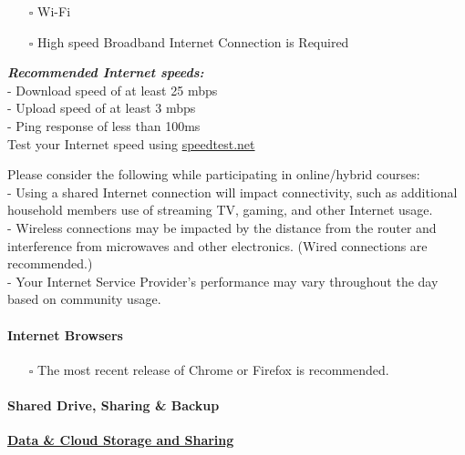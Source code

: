 \documentclass[
]{book}
\providecommand{\tightlist}{%
  \setlength{\itemsep}{0pt}\setlength{\parskip}{0pt}}
\theoremstyle{definition}
\theoremstyle{definition}
\theoremstyle{definition}
\theoremstyle{definition}
\theoremstyle{remark}
\begin{document}
\begin{itemize}
\tightlist
\item[$\square$]
  Wi-Fi\\
\item[$\square$]
  High speed Broadband Internet Connection is Required
\end{itemize}

\textbf{\emph{Recommended Internet speeds:}}\\
- Download speed of at least 25 mbps\\
- Upload speed of at least 3 mbps\\
- Ping response of less than 100ms\\
Test your Internet speed using \url{speedtest.net}

Please consider the following while participating in online/hybrid courses:\\
- Using a shared Internet connection will impact connectivity, such as additional household members use of streaming TV, gaming, and other Internet usage.\\
- Wireless connections may be impacted by the distance from the router and interference from microwaves and other electronics. (Wired connections are recommended.)\\
- Your Internet Service Provider's performance may vary throughout the day based on community usage.

\hypertarget{internet-browsers}{%
\paragraph*{Internet Browsers}\label{internet-browsers}}

\begin{itemize}
\tightlist
\item[$\square$]
  The most recent release of Chrome or Firefox is recommended.
\end{itemize}

\hypertarget{shared-drive-sharing-backup}{%
\paragraph*{Shared Drive, Sharing \& Backup}\label{shared-drive-sharing-backup}}

\textbf{\href{https://trinitywestern.teamdynamix.com/TDClient/1904/Portal/KB/ArticleDet?ID=128533}{Data \& Cloud Storage and Sharing}}
\end{document}
